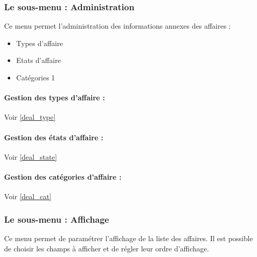 \subsubsection{Le sous-menu : Administration}

Ce menu permet l'administration des informations annexes des affaires :\\

\begin{itemize}
\item Types d'affaire
\item Etats d'affaire
\item Catégories 1
\end{itemize}

\paragraph{Gestion des types d'affaire : } Voir \ref{deal_type}

\paragraph{Gestion des états d'affaire : } Voir \ref{deal_state}

\paragraph{Gestion des catégories d'affaire : } Voir \ref{deal_cat}



\subsubsection{Le sous-menu : Affichage}

Ce menu permet de paramétrer l'affichage de la liste des affaires. Il est possible de choisir les champs à afficher et de régler leur ordre d'affichage.
